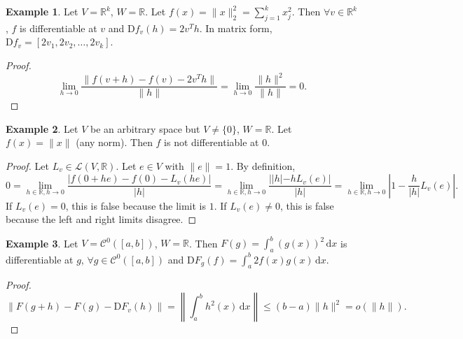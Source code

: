 \documentclass[12pt]{article}
\theoremstyle{plain}
\theoremstyle{definition}
\newtheorem*{eg}{Example}
\begin{document}
\begin{eg}
    Let $V = \mathbb{R}^k$, $W=\mathbb{R}$.
    Let $f(x) = \|x\|_2^2 = \sum_{j=1}^k x_j^2$.
    Then $\forall v\in\mathbb{R}^k$, $f$ is differentiable at $v$ and $\mathrm{D}f_v(h) = 2v^Th$.
    In matrix form, 
    $\mathrm{D}f_v=[2v_1, 2v_2, \ldots, 2v_k]$.
\end{eg}
\begin{proof}
    \[
        \lim_{h\rightarrow 0}\frac{\|f(v+h)-f(v)-2v^Th\|}{\|h\|} = \lim_{h\rightarrow 0}\frac{\|h\|^2}{\|h\|} = 0.
    \]
\end{proof}

\begin{eg}
    Let $V$ be an arbitrary space but $V\neq \{0\}$, $W=\mathbb{R}$.
    Let $f(x) = \|x\|$ (any norm).
    Then $f$ is not differentiable at $0$.
\end{eg}
\begin{proof}
    Let $L_v\in\mathcal{L}(V,\mathbb{R})$.
    Let $e\in V$ with $\|e\|=1$.
    By definition,
    \[
        0=\lim_{h\in\mathbb{R}, h\rightarrow0}\frac{|f(0+he)-f(0)-L_v(he)|}{|h|}
        =\lim_{h\in\mathbb{R}, h\rightarrow0}\frac{| |h|-hL_v(e)|}{|h|}
        =\lim_{h\in\mathbb{R}, h\rightarrow0}\left|1-\frac{h}{|h|}L_v(e)\right|.
    \]
    If $L_v(e)=0$, this is false because the limit is $1$.
    If $L_v(e)\neq 0$, this is false because the left and right limits disagree.
\end{proof}

\begin{eg}
    Let $V=\mathcal{C}^0([a,b])$, $W=\mathbb{R}$.
    Then $F(g) = \int_a^b (g(x))^2\,\mathrm{d}x$ is differentiable at $g$, $\forall g\in \mathcal{C}^0([a,b])$ and
    $\mathrm{D}F_g(f)=\int_a^b2f(x)g(x)\,\mathrm{d}x$.
\end{eg}
\begin{proof}
    \[
        \|F(g+h)-F(g)-\mathrm{D}F_v(h)\| = \left\| \int_a^b h^2(x)\,\mathrm{d}x\right\| \leq (b-a) \|h\|^2 = o(\|h\|).
    \]
\end{proof}
\end{document}
